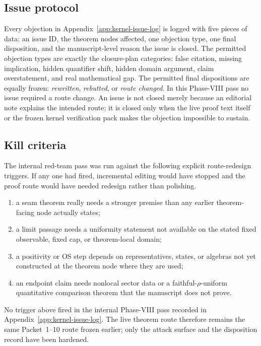 \subsection*{Issue protocol}
Every objection in Appendix~\ref{app:kernel-issue-log} is logged with five pieces of data: an issue ID, the theorem nodes affected, one objection type, one final disposition, and the manuscript-level reason the issue is closed. The permitted objection types are exactly the closure-plan categories: false citation, missing implication, hidden quantifier shift, hidden domain argument, claim overstatement, and real mathematical gap. The permitted final dispositions are equally frozen: \emph{rewritten}, \emph{rebutted}, or \emph{route changed}. In this Phase-VIII pass no issue required a route change. An issue is not closed merely because an editorial note explains the intended route; it is closed only when the live proof text itself or the frozen kernel verification pack makes the objection impossible to sustain.

\subsection*{Kill criteria}
The internal red-team pass was run against the following explicit route-redesign triggers. If any one had fired, incremental editing would have stopped and the proof route would have needed redesign rather than polishing.
\begin{enumerate}[label=\textup{(\roman*)},leftmargin=2.25em]
\item a seam theorem really needs a stronger premise than any earlier theorem-facing node actually states;
\item a limit passage needs a uniformity statement not available on the stated fixed observable, fixed cap, or theorem-local domain;
\item a positivity or OS step depends on representatives, states, or algebras not yet constructed at the theorem node where they are used;
\item an endpoint claim needs nonlocal sector data or a faithful-$\rho$-uniform quantitative comparison theorem that the manuscript does not prove.
\end{enumerate}
No trigger above fired in the internal Phase-VIII pass recorded in Appendix~\ref{app:kernel-issue-log}. The live theorem route therefore remains the same Packet~1--10 route frozen earlier; only the attack surface and the disposition record have been hardened.

